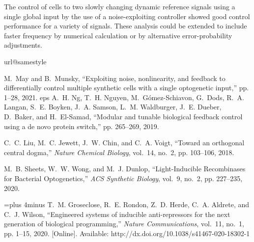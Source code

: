 \documentclass[12pt]{iopart}
\begin{document}
The control of cells to two slowly changing dynamic reference signals using a single global input by the use of a noise-exploiting controller showed good control performance for a variety of signals. These analysis could be extended to include faster frequency by numerical calculation or by alternative error-probability adjustments.

\begin{thebibliography}{10}
\providecommand{\url}[1]{#1}
\csname url@samestyle\endcsname
\providecommand{\newblock}{\relax}
\providecommand{\bibinfo}[2]{#2}
\providecommand{\BIBentrySTDinterwordspacing}{\spaceskip=0pt\relax}
\providecommand{\BIBentryALTinterwordstretchfactor}{4}
\providecommand{\BIBentryALTinterwordspacing}{\spaceskip=\fontdimen2\font plus
\BIBentryALTinterwordstretchfactor\fontdimen3\font minus
  \fontdimen4\font\relax}
\providecommand{\BIBforeignlanguage}[2]{{%
\expandafter\ifx\csname l@#1\endcsname\relax
\typeout{** WARNING: IEEEtran.bst: No hyphenation pattern has been}%
\typeout{** loaded for the language `#1'. Using the pattern for}%
\typeout{** the default language instead.}%
\else
\language=\csname l@#1\endcsname
\fi
#2}}
\providecommand{\BIBdecl}{\relax}
\BIBdecl

M.~May and B.~Munsky, ``{Exploiting noise, nonlinearity, and feedback to
  differentially control multiple synthetic cells with a single optogenetic
  input},'' pp. 1--28, 2021.
eps
A.~H. Ng, T.~H. Nguyen, M.~G{\'{o}}mez-Schiavon, G.~Dods, R.~A. Langan, S.~E.
  Boyken, J.~A. Samson, L.~M. Waldburger, J.~E. Dueber, D.~Baker, and
  H.~El-Samad, ``{Modular and tunable biological feedback control using a de
  novo protein switch},'' pp. 265--269, 2019.

C.~C. Liu, M.~C. Jewett, J.~W. Chin, and C.~A. Voigt, ``{Toward an orthogonal
  central dogma},'' \emph{Nature Chemical Biology}, vol.~14, no.~2, pp.
  103--106, 2018.

M.~B. Sheets, W.~W. Wong, and M.~J. Dunlop, ``{Light-Inducible Recombinases for
  Bacterial Optogenetics},'' \emph{ACS Synthetic Biology}, vol.~9, no.~2, pp.
  227--235, 2020.

\BIBentryALTinterwordspacing
T.~M. Groseclose, R.~E. Rondon, Z.~D. Herde, C.~A. Aldrete, and C.~J. Wilson,
  ``{Engineered systems of inducible anti-repressors for the next generation of
  biological programming},'' \emph{Nature Communications}, vol.~11, no.~1, pp.
  1--15, 2020. [Online]. Available:
  \url{http://dx.doi.org/10.1038/s41467-020-18302-1}
\BIBentrySTDinterwordspacing


\end{thebibliography}
\end{document}
